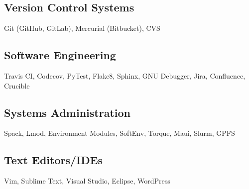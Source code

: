 
\subsection{Version Control Systems}
Git (GitHub, GitLab), Mercurial (Bitbucket), CVS

\subsection{Software Engineering}
Travis CI, Codecov, PyTest, Flake8, Sphinx, GNU Debugger, Jira, Confluence, Crucible

\subsection{Systems Administration}
Spack, Lmod, Environment Modules, SoftEnv, Torque, Maui, Slurm, GPFS

\subsection{Text Editors/IDEs}
Vim, Sublime Text, Visual Studio, Eclipse, WordPress
